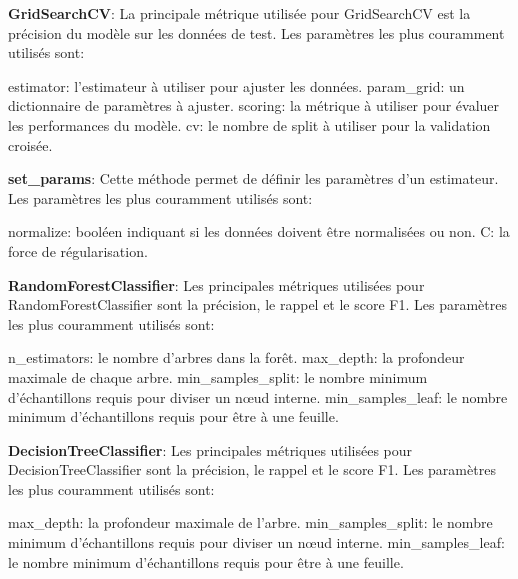 
\begin{DoxyEnumerate}
\item {\bfseries Grid\+Search\+CV}\+: La principale métrique utilisée pour Grid\+Search\+CV est la précision du modèle sur les données de test. Les paramètres les plus couramment utilisés sont\+:
\end{DoxyEnumerate}

estimator\+: l’estimateur à utiliser pour ajuster les données. param\+\_\+grid\+: un dictionnaire de paramètres à ajuster. scoring\+: la métrique à utiliser pour évaluer les performances du modèle. cv\+: le nombre de split à utiliser pour la validation croisée.


\begin{DoxyEnumerate}
\item {\bfseries set\+\_\+params}\+: Cette méthode permet de définir les paramètres d’un estimateur. Les paramètres les plus couramment utilisés sont\+:
\end{DoxyEnumerate}

normalize\+: booléen indiquant si les données doivent être normalisées ou non. C\+: la force de régularisation.


\begin{DoxyEnumerate}
\item {\bfseries Random\+Forest\+Classifier}\+: Les principales métriques utilisées pour Random\+Forest\+Classifier sont la précision, le rappel et le score F1. Les paramètres les plus couramment utilisés sont\+:
\end{DoxyEnumerate}

n\+\_\+estimators\+: le nombre d’arbres dans la forêt. max\+\_\+depth\+: la profondeur maximale de chaque arbre. min\+\_\+samples\+\_\+split\+: le nombre minimum d’échantillons requis pour diviser un nœud interne. min\+\_\+samples\+\_\+leaf\+: le nombre minimum d’échantillons requis pour être à une feuille.


\begin{DoxyEnumerate}
\item {\bfseries Decision\+Tree\+Classifier}\+: Les principales métriques utilisées pour Decision\+Tree\+Classifier sont la précision, le rappel et le score F1. Les paramètres les plus couramment utilisés sont\+:
\end{DoxyEnumerate}

max\+\_\+depth\+: la profondeur maximale de l’arbre. min\+\_\+samples\+\_\+split\+: le nombre minimum d’échantillons requis pour diviser un nœud interne. min\+\_\+samples\+\_\+leaf\+: le nombre minimum d’échantillons requis pour être à une feuille.


